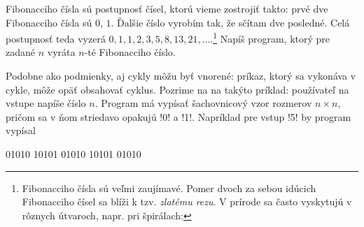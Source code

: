 \begin{uloha}
  \label{uloha:Fibonacci}
  Fibonacciho čísla sú postupnosť čísel, ktorú vieme zostrojiť takto: prvé dve
  Fibonacciho čísla sú $0$, $1$. Ďalšie číslo vyrobím tak, že sčítam dve posledné.
  Celá postupnosť teda vyzerá $0,1,1,2,3,5,8,13,21,\ldots$.\footnote{%
   Fibonacciho čísla sú veľmi zaujímavé. Pomer dvoch za sebou idúcich Fibonacciho
   čísel sa blíži k
   tzv. {\em zlatému rezu}. V prírode sa často vyskytujú v rôznych útvaroch, 
   napr. pri špirálach:\newline\newline

    }
    Napíš program, ktorý pre zadané $n$ vyráta $n$-té Fibonacciho číslo.

\end{uloha}

Podobne ako podmienky, aj cykly môžu byť vnorené: príkaz, ktorý sa vykonáva v cykle,
môže opäť obsahovať cyklus. Pozrime na na takýto príklad: používateľ na vstupe napíše číslo
$n$. Program má vypísať šachovnicový vzor rozmerov $n\times n$, pričom sa v ňom
striedavo opakujú \prg!0!
a \prg!1!. Napríklad pre vstup \prg!5! by program vypísal

\begin{outputBox}
01010
10101
01010
10101
01010
\end{outputBox}

